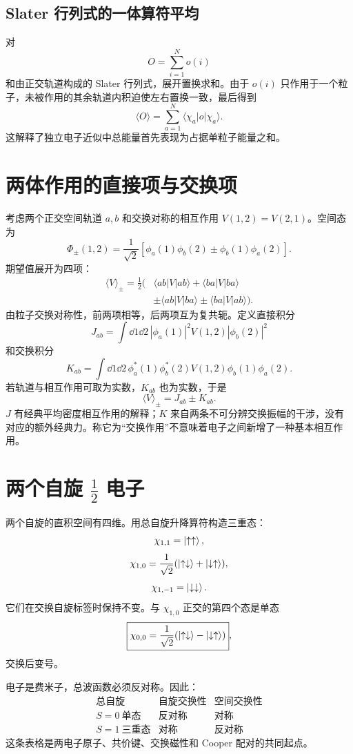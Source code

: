 \subsection{Slater 行列式的一体算符平均}
对
\[
O=\sum_{i=1}^No(i)
\]
和由正交轨道构成的 Slater 行列式，展开置换求和。由于 $o(i)$ 只作用于一个粒子，未被作用的其余轨道内积迫使左右置换一致，最后得到
\[
\boxed{
\langle O\rangle=\sum_{a=1}^N\langle\chi_a|o|\chi_a\rangle}.
\]
这解释了独立电子近似中总能量首先表现为占据单粒子能量之和。

\section{两体作用的直接项与交换项}
考虑两个正交空间轨道 $a,b$ 和交换对称的相互作用
$V(1,2)=V(2,1)$。空间态为
\[
\Phi_\pm(1,2)=\frac1{\sqrt2}
[\phi_a(1)\phi_b(2)\pm\phi_b(1)\phi_a(2)].
\]
期望值展开为四项：
\[
\begin{aligned}
\langle V\rangle_\pm
=\frac12\big(&\langle ab|V|ab\rangle
+\langle ba|V|ba\rangle\\
&\pm\langle ab|V|ba\rangle
\pm\langle ba|V|ab\rangle\big).
\end{aligned}
\]
由粒子交换对称性，前两项相等，后两项互为复共轭。定义直接积分
\[
\boxed{
J_{ab}=\int\dd1\dd2\,
|\phi_a(1)|^2V(1,2)|\phi_b(2)|^2}
\]
和交换积分
\[
\boxed{
K_{ab}=\int\dd1\dd2\,
\phi_a^*(1)\phi_b^*(2)
V(1,2)\phi_b(1)\phi_a(2)}.
\]
若轨道与相互作用可取为实数，$K_{ab}$ 也为实数，于是
\[
\boxed{\langle V\rangle_\pm=J_{ab}\pm K_{ab}}.
\]
$J$ 有经典平均密度相互作用的解释；$K$ 来自两条不可分辨交换振幅的干涉，没有对应的额外经典力。称它为“交换作用”不意味着电子之间新增了一种基本相互作用。

\section{两个自旋 $\tfrac12$ 电子}
两个自旋的直积空间有四维。用总自旋升降算符构造三重态：
\[
\chi_{1,1}=\left|\uparrow\uparrow\right\rangle,
\]
\[
\chi_{1,0}
=\frac1{\sqrt2}
(\left|\uparrow\downarrow\right\rangle+\left|\downarrow\uparrow\right\rangle),
\]
\[
\chi_{1,-1}=\left|\downarrow\downarrow\right\rangle.
\]
它们在交换自旋标签时保持不变。与 $\chi_{1,0}$ 正交的第四个态是单态
\[
\boxed{
\chi_{0,0}
=\frac1{\sqrt2}
(\left|\uparrow\downarrow\right\rangle-\left|\downarrow\uparrow\right\rangle)},
\]
交换后变号。

电子是费米子，总波函数必须反对称。因此：
\[
\begin{array}{c|c|c}
\text{总自旋}&\text{自旋交换性}&\text{空间交换性}\\ \hline
S=0\ \text{单态}&\text{反对称}&\text{对称}\\
S=1\ \text{三重态}&\text{对称}&\text{反对称}
\end{array}
\]
这条表格是两电子原子、共价键、交换磁性和 Cooper 配对的共同起点。

